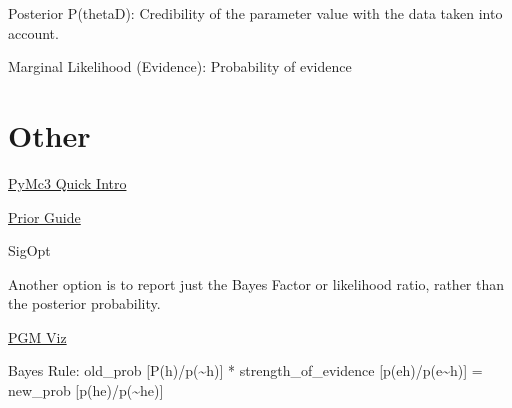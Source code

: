 \documentclass[]{book}
\begin{document}
Posterior P(theta\textbar{}D): Credibility of the parameter value with the data taken into account.

Marginal Likelihood (Evidence): Probability of evidence

\hypertarget{other-3}{%
\section{Other}\label{other-3}}

\href{https://docs.google.com/presentation/d/1buknIrG5b8u0twrwvlxcTudIOdx68AlqDiST_A_jJ9g/edit\#slide=id.g4254d546f6_0_0}{PyMc3 Quick Intro}

\href{https://github.com/stan-dev/stan/wiki/Prior-Choice-Recommendations}{Prior Guide}

SigOpt

Another option is to report just the Bayes Factor or likelihood ratio, rather than the posterior probability.

\href{http://daft-pgm.org}{PGM Viz}

Bayes Rule: old\_prob {[}P(h)/p(\textasciitilde{}h){]} * strength\_of\_evidence {[}p(e\textbar{}h)/p(e\textbar{}\textasciitilde{}h){]} = new\_prob {[}p(h\textbar{}e)/p(\textasciitilde{}h\textbar{}e){]}
\end{document}

